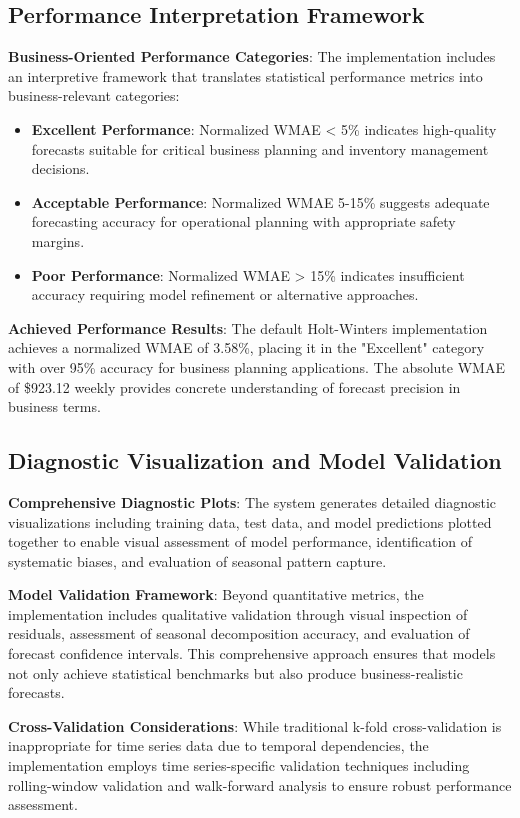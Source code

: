 \subsection{Performance Interpretation Framework}

\textbf{Business-Oriented Performance Categories}: The implementation includes an interpretive framework that translates statistical performance metrics into business-relevant categories:
\begin{itemize}
\item \textbf{Excellent Performance}: Normalized WMAE < 5\% indicates high-quality forecasts suitable for critical business planning and inventory management decisions.
\item \textbf{Acceptable Performance}: Normalized WMAE 5-15\% suggests adequate forecasting accuracy for operational planning with appropriate safety margins.
\item \textbf{Poor Performance}: Normalized WMAE > 15\% indicates insufficient accuracy requiring model refinement or alternative approaches.
\end{itemize}

\textbf{Achieved Performance Results}: The default Holt-Winters implementation achieves a normalized WMAE of 3.58\%, placing it in the "Excellent" category with over 95\% accuracy for business planning applications. The absolute WMAE of \$923.12 weekly provides concrete understanding of forecast precision in business terms.

\subsection{Diagnostic Visualization and Model Validation}

\textbf{Comprehensive Diagnostic Plots}: The system generates detailed diagnostic visualizations including training data, test data, and model predictions plotted together to enable visual assessment of model performance, identification of systematic biases, and evaluation of seasonal pattern capture.

\textbf{Model Validation Framework}: Beyond quantitative metrics, the implementation includes qualitative validation through visual inspection of residuals, assessment of seasonal decomposition accuracy, and evaluation of forecast confidence intervals. This comprehensive approach ensures that models not only achieve statistical benchmarks but also produce business-realistic forecasts.

\textbf{Cross-Validation Considerations}: While traditional k-fold cross-validation is inappropriate for time series data due to temporal dependencies, the implementation employs time series-specific validation techniques including rolling-window validation and walk-forward analysis to ensure robust performance assessment.

